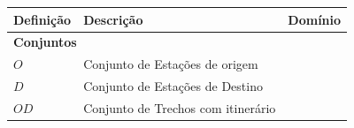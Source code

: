 \begin{table}[H]
	\centering
	\small
	\begin{tabular}{p{2cm} p{9.5cm} p{3.2cm}}
		\toprule
		\textbf{Definição} & \textbf{Descrição}                                                                                                                                                                                                                                                                                                                                                                                                            & \textbf{Domínio}                             \\ \midrule
		\multicolumn{3}{l}{\textbf{Conjuntos}}                                                                                                                                                                                                                                                                                                                                                                                                                                                            \\ \midrule
		$O$                & Conjunto de Estações de origem                                                                                                                                                                                                                                                                                                                                                                                                &                                              \\
		$D$                & Conjunto de Estações de Destino                                                                                                                                                                                                                                                                                                                                                                                               &                                              \\
		$OD$               & Conjunto de Trechos com itinerário                                                                                                                                                                                                                                                                                                                                                                                            &                                              \\

\end{tabular}
\end{table}
